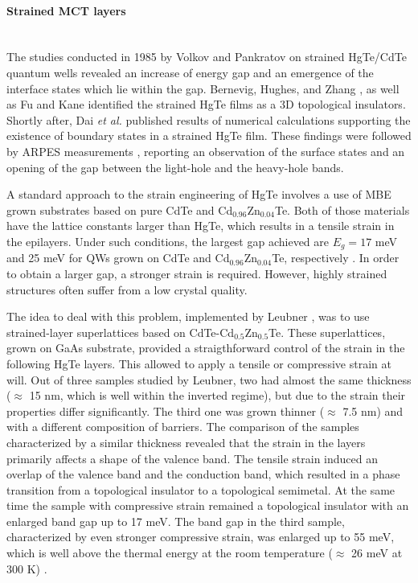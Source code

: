 \documentclass[titlepage,a4paper]{book}
\newcommand{\wciecie}{\quad\phantom{v}}
\newcommand{\myparagraph}[1]{\paragraph{#1}\mbox{}\\}
\begin{document}
\myparagraph{Strained MCT layers}
\wciecie
The studies conducted in 1985 by Volkov and Pankratov \cite{Volkow_strainedMCT} on strained HgTe/CdTe quantum wells revealed an increase of energy gap and an emergence of the interface states which lie within the gap. Bernevig, Hughes, and Zhang \cite{Bernevig_Topology2}, as well as Fu and Kane \cite{Kane_Fu} identified the strained HgTe films as a 3D topological insulators. Shortly after, Dai \textit{et al.} \cite{Dai_MCT_layers} published results of numerical calculations supporting the existence of boundary states in a strained HgTe film. These findings were followed by ARPES measurements \cite{Brune_State} \cite{Crauste_StrainedMCT}, reporting an observation of the surface states and an opening of the gap between the light-hole and the heavy-hole bands.
 
A standard approach to the strain engineering of HgTe involves a use of MBE grown substrates based on pure CdTe and Cd$_{0.96}$Zn$_{0.04}$Te. Both of those materials have the lattice constants larger than HgTe, which results in a tensile strain in the epilayers. Under such conditions, the largest gap achieved are $E_g = 17$ meV and 25 meV for QWs grown on CdTe and Cd$_{0.96}$Zn$_{0.04}$Te, respectively \cite{Pfeuffer_State}. In order to obtain a larger gap, a stronger strain is required. However, highly strained structures often suffer from a low crystal quality. 

The idea to deal with this problem, implemented by Leubner \cite{Leubner_State}, was to use strained-layer superlattices based on CdTe-Cd$_{0.5}$Zn$_{0.5}$Te. These superlattices, grown on GaAs substrate, provided a straigthforward control of the strain in the following HgTe layers. This allowed to apply a tensile or compressive strain at will. Out of three samples studied by Leubner, two had almost the same thickness ($\approx$ 15 nm, which is well within the inverted regime), but due to the strain their properties differ significantly. The third one was grown thinner ($\approx$ 7.5 nm) and with a different composition of barriers. The comparison of the samples characterized by a similar thickness revealed that the strain in the layers primarily affects a shape of the valence band. The tensile strain induced an overlap of the valence band and the conduction band, which resulted in a phase transition from a topological insulator to a topological semimetal. At the same time the sample with compressive strain remained a topological insulator with an enlarged band gap up to 17 meV. The band gap in the third sample, characterized by even stronger compressive strain, was enlarged up to 55 meV, which is well above the thermal energy at the room temperature ($\approx$ 26 meV at 300 K) \cite{Leubner_State}. 
\end{document}

